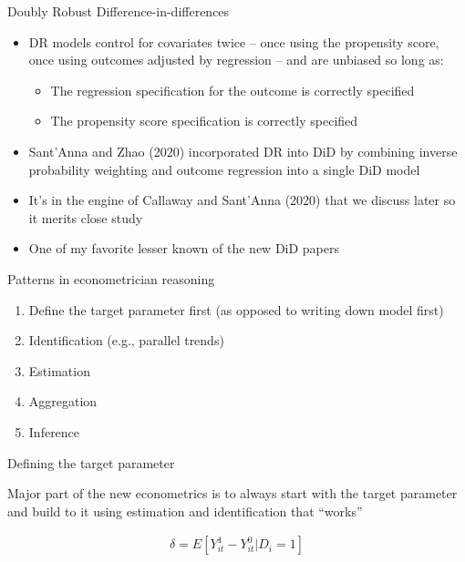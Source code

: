 \documentclass{beamer}
\begin{document}
\begin{frame}{Doubly Robust Difference-in-differences}

\begin{itemize}
\item DR models control for covariates twice -- once using the propensity score, once using outcomes adjusted by regression -- and are unbiased so long as:
	\begin{itemize}
	\item The regression specification for the outcome is correctly specified
	\item The propensity score specification is correctly specified
	\end{itemize}
\item Sant'Anna and Zhao (2020) incorporated DR into DiD by combining inverse probability weighting and outcome regression into a single DiD model
\item It's in the engine of Callaway and Sant'Anna (2020) that we discuss later so it merits close study
\item One of my favorite lesser known of the new DiD papers
\end{itemize}

\end{frame}

\begin{frame}{Patterns in econometrician reasoning}

\begin{enumerate}
\item Define the target parameter first (as opposed to writing down model first)
\item Identification (e.g., parallel trends)
\item Estimation
\item Aggregation
\item Inference
\end{enumerate}

\end{frame}


\begin{frame}{Defining the target parameter}

Major part of the new econometrics is to always start with the target parameter and build to it using estimation and identification that ``works''

\bigskip

\begin{eqnarray*}
\delta = E[Y^1_{it} - Y^0_{it} | D_i=1]
\end{eqnarray*}

\end{frame}
\end{document}
